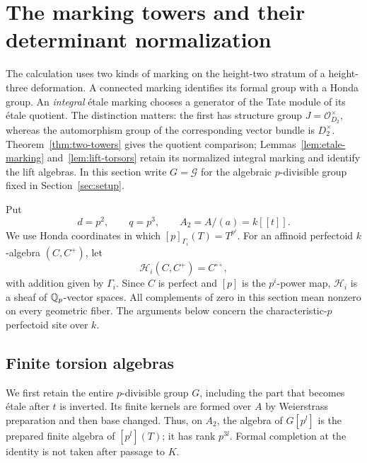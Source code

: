 \section{The marking towers and their determinant normalization}
\label{sec:towers}

The calculation uses two kinds of marking on the height-two stratum of a
height-three deformation.  A connected marking identifies its formal group
with a Honda group.  An \emph{integral} étale marking chooses a generator of
the Tate module of its étale quotient.  The distinction matters: the first
has structure group $J=\mathcal O_{D_2}^{\times}$, whereas the automorphism
group of the corresponding vector bundle is $D_2^{\times}$.
Theorem~\ref{thm:two-towers} gives the quotient comparison;
Lemmas~\ref{lem:etale-marking} and~\ref{lem:lift-torsors} retain its
normalized integral marking and identify the lift algebras.
In this section write $G=\mathcal G$ for the algebraic $p$-divisible
group fixed in Section~\ref{sec:setup}.

Put
\[
 d=p^2,\qquad q=p^3,\qquad A_2=A/(a)=k[[t]].
\]
We use Honda coordinates in which $[p]_{\Gamma_i}(T)=T^{p^i}$.
For an affinoid perfectoid $k$-algebra $(C,C^+)$, let
\[
 \mathcal H_i(C,C^+)=C^{\circ\circ},
\]
with addition given by $\Gamma_i$.  Since $C$ is perfect and $[p]$ is the
$p^i$-power map, $\mathcal H_i$ is a sheaf of $\mathbb Q_p$-vector spaces.
All complements of zero in this section mean nonzero on every geometric
fiber.  The arguments below concern the characteristic-$p$ perfectoid
site over $k$.

\subsection{Finite torsion algebras}

We first retain the entire $p$-divisible group $G$, including the part that
becomes étale after $t$ is inverted.  Its finite kernels are formed over
$A$ by Weierstrass preparation and then base changed.  Thus, on $A_2$,
the algebra of $G[p^l]$ is the prepared finite algebra of $[p^l](T)$;
it has rank $p^{3l}$.  Formal completion at the identity is not taken
after passage to $K$.

